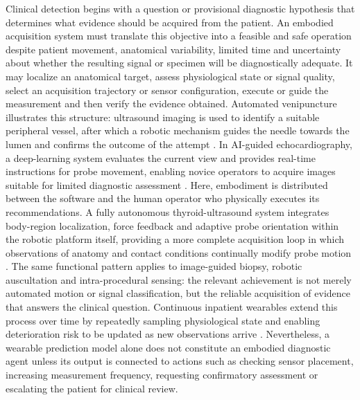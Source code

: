 Clinical detection begins with a question or provisional diagnostic hypothesis that determines what evidence should be acquired from the patient. An embodied acquisition system must translate this objective into a feasible and safe operation despite patient movement, anatomical variability, limited time and uncertainty about whether the resulting signal or specimen will be diagnostically adequate. It may localize an anatomical target, assess physiological state or signal quality, select an acquisition trajectory or sensor configuration, execute or guide the measurement and then verify the evidence obtained. Automated venipuncture illustrates this structure: ultrasound imaging is used to identify a suitable peripheral vessel, after which a robotic mechanism guides the needle towards the lumen and confirms the outcome of the attempt \cite{Leipheimer2019AutomatedVenipuncture}. In AI-guided echocardiography, a deep-learning system evaluates the current view and provides real-time instructions for probe movement, enabling novice operators to acquire images suitable for limited diagnostic assessment \cite{Narang2021GuidedEchoAcquisition}. Here, embodiment is distributed between the software and the human operator who physically executes its recommendations. A fully autonomous thyroid-ultrasound system integrates body-region localization, force feedback and adaptive probe orientation within the robotic platform itself, providing a more complete acquisition loop in which observations of anatomy and contact conditions continually modify probe motion \cite{Su2024AutonomousThyroidUltrasound}. The same functional pattern applies to image-guided biopsy, robotic auscultation and intra-procedural sensing: the relevant achievement is not merely automated motion or signal classification, but the reliable acquisition of evidence that answers the clinical question. Continuous inpatient wearables extend this process over time by repeatedly sampling physiological state and enabling deterioration risk to be updated as new observations arrive \cite{Scheid2025WearableDeterioration}. Nevertheless, a wearable prediction model alone does not constitute an embodied diagnostic agent unless its output is connected to actions such as checking sensor placement, increasing measurement frequency, requesting confirmatory assessment or escalating the patient for clinical review.

